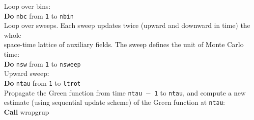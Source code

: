 \begin{mdframed}[frametitle={Basic structure of the auxiliary-field QMC implementation (\path{Prog/main.F90}):}]
{Loop over bins: \\
\textbf{Do} \texttt{nbc} from  \texttt{1} to \texttt{nbin} \\
\hspace*{1em} Loop over sweeps. Each sweep updates twice (upward and downward in time) the whole\\
\hspace*{1em} space-time lattice of auxiliary fields. The sweep defines the unit of Monte Carlo time:\\
\hspace*{1em} \textbf{Do} \texttt{nsw} from  \texttt{1} to \texttt{nsweep}  \\
\hspace*{2em} Upward sweep:\\
\hspace*{2em} \textbf{Do} \texttt{ntau} from \texttt{1} to \texttt{ltrot}\\      
\hspace*{3em} Propagate the Green function from time \texttt{ntau $-$ 1} to \texttt{ntau}, and compute a new\\
\hspace*{3em} estimate (using sequential update scheme) of the Green function at \texttt{ntau}: \\
\hspace*{3em} \textbf{Call} wrapgrup\\
         
}
\end{mdframed}
